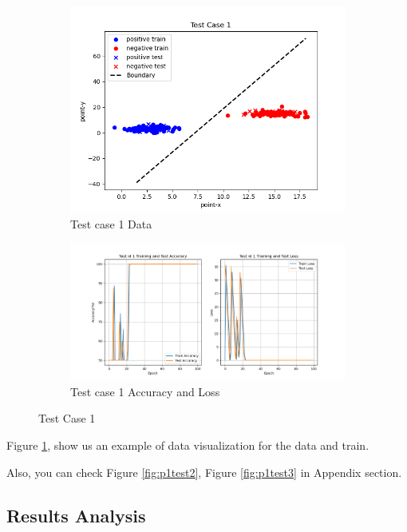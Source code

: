 \documentclass{article}
\begin{document}
\begin{figure}[!ht]
  \centering
  \begin{subfigure}[b]{0.45\textwidth}
    \includegraphics[width=\textwidth]{img/Part1/test1_data.png}
    \caption{Test case 1 Data}
  \end{subfigure}
  \begin{subfigure}[b]{1\textwidth}
    \includegraphics[width=\textwidth]{img/Part1/test1_curve.png}
    \caption{Test case 1 Accuracy and Loss}
  \end{subfigure}
  \caption{Test Case 1}
  \label{fig:p1test1}
\end{figure}



Figure \ref{fig:p1test1},  show us an example of data visualization for the data and train. 

Also, you can check Figure \ref{fig:p1test2}, Figure \ref{fig:p1test3} in Appendix section. 

\subsection{Results Analysis}
\end{document}
